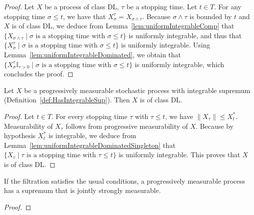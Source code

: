 \begin{proof}\leanok
Let $X$ be a process of class DL, $\tau$ be a stopping time. Let $t \in T$. For any stopping time $\sigma \le t$, we have that $X_\sigma^\tau = X_{\sigma \land \tau}$. Because $\sigma \land \tau$ is bounded by $t$ and $X$ is of class DL, we deduce from Lemma~\ref{lem:uniformIntegrableComp} that $\{X_{\sigma \land \tau} \mid \sigma \text{ is a stopping time with } \sigma \le t\}$ is uniformly integrable, and thus that $\{X^\tau_\sigma \mid \sigma \text{ is a stopping time with } \sigma \le t\}$ is uniformly integrable. Using Lemma~\ref{lem:uniformIntegrableDominated}, we obtain that $\{X^\tau_\sigma \mathbb{I}_{\tau > 0} \mid \sigma \text{ is a stopping time with } \sigma \le t\}$ is uniformly integrable, which concludes the proof.
\end{proof}


\begin{lemma}\label{lem:Integrable.classDL}
Let $X$ be a progressively measurable stochastic process with integrable supremum (Definition~\ref{def:HasIntegrableSup}). Then $X$ is of class DL.
\end{lemma}

\begin{proof}  
Let $t \in T$. For every stopping time $\tau$ with $\tau \le t$, we have $\|X_\tau\| \le X^*_t$.
Measurability of $X_\tau$ follows from progressive measurability of $X$.
Because by hypothesis $X^*_t$ is integrable, we deduce from Lemma~\ref{lem:uniformIntegrableDominatedSingleton} that $\{X_\tau \mid \tau \text{ is a stopping time with } \tau \le t\}$ is uniformly integrable.
This proves that $X$ is of class DL.
\end{proof}


\begin{lemma}\label{lem:IsStronglyProgressive.hasStronglyMeasurableSup}
  If the filtration satisfies the usual conditions, a progressively measurable process has a supremum that is jointly strongly measurable.
\end{lemma}

\begin{proof}  

\end{proof}

